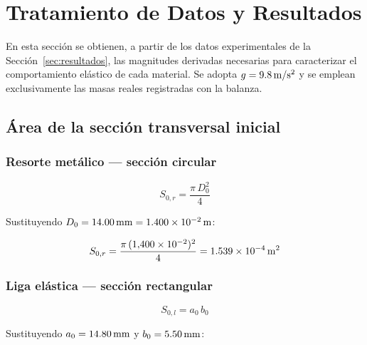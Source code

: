 
\section{Tratamiento de Datos y Resultados}
\label{sec:tratamiento}

En esta sección se obtienen, a partir de los datos experimentales de la
Sección~\ref{sec:resultados}, las magnitudes derivadas necesarias para
caracterizar el comportamiento elástico de cada material. Se adopta
$g = \qty{9{,}8}{m/s^2}$ y se emplean exclusivamente las masas reales
registradas con la balanza.

\subsection{Área de la sección transversal inicial}

\subsubsection{Resorte metálico — sección circular}

\begin{equation}
    S_{0,r} = \frac{\pi\,D_0^2}{4}
    \label{eq:area_resorte}
\end{equation}

Sustituyendo $D_0 = \qty{14{,}00}{mm} = \qty{1{,}400e-2}{m}$:

\begin{equation*}
    S_{0,r} = \frac{\pi\,(1{,}400\times10^{-2})^2}{4}
             = \qty{1{,}539e-4}{m^2}
\end{equation*}

\subsubsection{Liga elástica — sección rectangular}

\begin{equation}
    S_{0,l} = a_0\,b_0
    \label{eq:area_liga}
\end{equation}

Sustituyendo $a_0 = \qty{14{,}80}{mm}$ y $b_0 = \qty{5{,}50}{mm}$:

